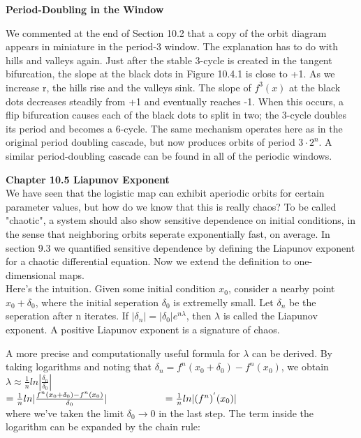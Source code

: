 \documentclass{article}
\newcommand\tab[1][1cm]{\hspace*{#1}}
\begin{document}
\textbf {Period-Doubling in the Window} \\ \tab

We commented at the end of Section 10.2 that a copy of the orbit diagram appears in miniature in the period-3 window. The explanation has to do with hills and valleys again. Just after the stable 3-cycle is created in the tangent bifurcation, the slope at the black dots in Figure 10.4.1 is close to +1. As we increase r, the hills rise and the valleys sink. The slope of $f^{3}(x)$ at the black dots decreases steadily from +1 and eventually reaches -1. When this occurs, a flip bifurcation causes each of the black dots to split in two; the 3-cycle doubles its period and becomes a 6-cycle. The same mechanism operates here as in the original period doubling cascade, but now produces orbits of period $3 \cdot 2^{n}$. A similar period-doubling cascade can be found in all of the periodic windows.

\textbf {Chapter 10.5 Liapunov Exponent} \\

We have seen that the logistic map can exhibit aperiodic orbits for certain parameter values, but how do we know that this is really chaos? To be called "chaotic", a system should also show sensitive dependence on initial conditions, in the sense that neighboring orbits seperate exponentially fast, on average. In section 9.3 we quantified sensitive dependence by defining the Liapunov exponent for a chaotic differential equation. Now we extend the definition to one-dimensional maps. \\

Here's the intuition. Given some initial condition $x_{0}$, consider a nearby point $x_{0}+\delta_{0}$, where the initial seperation $\delta_{0}$ is extremelly small. Let $\delta_{n}$ be the seperation after n iterates. If $|\delta_{n}|=|\delta_{0}|e^{n \lambda}$, then $\lambda $ is called the Liapunov exponent. A positive Liapunov exponent is a signature of chaos. \\ \tab

A more precise and computationally useful formula for $\lambda$ can be derived. By taking logarithms and noting that $\delta_{n}=f^{n}(x_{0}+\delta_{0})-f^{n}(x_{0})$, we obtain \\ \tab \tab
$\lambda \approx \frac{1}{n}ln|\frac{\delta_{n}}{\delta_{0}}|$ \\ \tab \tab
$= \frac{1}{n}ln|\frac{f^{n}(x_{0}+\delta_{0})-f^{n}(x_{0})}{\delta_{0}}| \\ \tab \tab
= \frac{1}{n}ln|(f^{n})^{'}(x_{0})|$ \\
where we've taken the limit $\delta_{0} \to 0$ in the last step. The term inside the logarithm can be expanded by the chain rule: \\ \tab \tab
\end{document}
